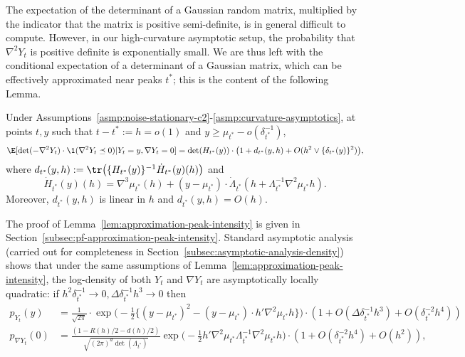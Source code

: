 \documentclass{article}
\begin{document}
	The expectation of the determinant of a Gaussian random matrix, multiplied by the indicator that the matrix is positive semi-definite, is in general difficult to compute. However, in our high-curvature asymptotic setup, the probability that $\nabla^2 Y_t$ is positive definite is exponentially small. We are thus left with the conditional expectation of a determinant of a Gaussian matrix, which can be effectively approximated near peaks $t^*$; this is the content of the following Lemma.
	\begin{lemma}
		\label{lem:approximation-peak-intensity}
		Under Assumptions~\ref{asmp:noise-stationary-c2}-\ref{asmp:curvature-asymptotics}, at points $t,y$ such that $t - t^* := h = o(1)$ and $y \geq \mu_{t^*} - o(\delta_{t^*}^{-1})$,
		\begin{equation}
			\label{eqn:approximate-intensity-1}
			\E[\det(-\nabla^2 Y_t) \cdot \1(\nabla^2 Y_t \preceq 0)|Y_t = y,\nabla Y_t = 0] =  \det(H_{t^*}(y))\cdot\big(1 + d_{t^*}(y,h) + O(h^2 \vee \{\delta_{t^*}(y)\}^2)\big),
		\end{equation}
		where $d_{t^*}(y,h) := \tr\big(\{H_{t^*}(y)\}^{-1} \dot{H}_{t^*}(y)(h)\big)$ and
		\begin{equation}
			\label{eqn:hessian-deterministic-equivalent-derivative}
			\dot{H}_{t^*}(y)(h) = \nabla^3 \mu_{t^*}(h) + (y - \mu_{t^*})\cdot \dot{\Lambda}_{t^*}(h + \Lambda_{t^*}^{-1} \nabla^2 \mu_{t^*}h).
		\end{equation}
		Moreover, $d_{t^*}(y,h)$ is linear in $h$ and $d_{t^*}(y,h) = O(h)$.
	\end{lemma}
	The proof of Lemma~\ref{lem:approximation-peak-intensity} is given in Section~\ref{subsec:pf-approximation-peak-intensity}. Standard asymptotic analysis (carried out for completeness in Section~\ref{subsec:asymptotic-analysis-density}) shows that under the same assumptions of Lemma~\ref{lem:approximation-peak-intensity}, the log-density of both $Y_t$ and $\nabla Y_t$ are asymptotically locally quadratic: if $h^2 \delta_{t^*}^{-1} \to 0, \Delta \delta_{t^*}^{-1}h^3 \to 0$ then
	\begin{align}
		p_{Y_t}(y) & = \frac{1}{\sqrt{2\pi}} \cdot \exp\Big(-\frac{1}{2}\Big\{(y - \mu_{t^*})^2 - (y - \mu_{t^*}) \cdot h'\nabla^2 \mu_{t^*} h\Big\} \Big) \cdot (1 + O(\Delta \delta_{t^*}^{-1} h^3) + O(\delta_{t^*}^{-2}h^4)) \label{eqn:asymptotic-density-height}\\
		p_{\nabla Y_t}(0) & = \frac{(1 - R(h)/2 - d(h)/2)}{\sqrt{(2\pi)^d\det(\Lambda_{t^*})}}\exp\bigg(-\frac{1}{2}h' \nabla^2 \mu_{t^*} \Lambda_{t^*}^{-1}  \nabla^2 \mu_{t^*} h \bigg) \cdot (1 + O(\delta_{t^*}^{-2}h^4) + O(h^2)), \label{eqn:asymptotic-density-gradient}
	\end{align}
\end{document}
